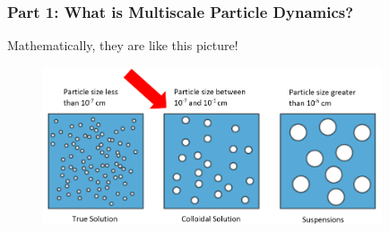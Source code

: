 \documentclass[aspectratio=169,xcolor=dvipsnames]{beamer}
\begin{document}
\begin{frame}
	\frametitle{Part 1: What is Multiscale Particle Dynamics?}
	 Mathematically, they are like this picture!
	
	\begin{figure}
		\includegraphics[width=10cm]{Particles2.png}
	\end{figure}
\end{frame}
\end{document}

